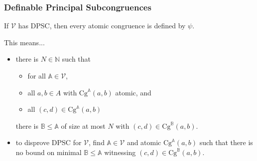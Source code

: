 \documentclass[compress,handout]{beamer}
\newcommand{\NN}{\mathbb{N}}
\newcommand{\V}{\mathcal{V}}
\newcommand{\A}{\mathbb{A}}
\theoremstyle{plain} \newtheorem{thm}{Theorem}
\theoremstyle{definition} \newtheorem{defn}[thm]{Definition}
\theoremstyle{remark} \newtheorem*{rk}{Remark}
\theoremstyle{plain} \newtheorem*{question}{Question}
\newcommand{\m}[1]{\mathbb{#1}}   %
\newcommand{\Cg}{\text{Cg}}
\begin{document}
\begin{frame} \frametitle{Definable Principal Subcongruences}
If $\V$ has DPSC, then every atomic congruence is defined by $\psi$.

\pause \vspace{6ex}

This means...
\begin{itemize} \setlength{\itemsep}{4ex}
  \item there is $N\in \NN$ such that 
  \begin{itemize}
    \pause \item for all $\A\in \V$,
    \pause \item all $a,b\in A$ with $\Cg^{\A}(a,b)$ atomic, and 
    \pause \item all $(c,d)\in \Cg^{\A}(a,b)$
  \end{itemize}
  \pause there is $\m{B}\leq \A$ of size at most $N$ with $(c,d)\in
  \Cg^{\m{B}}(a,b)$.

  \pause \item to disprove DPSC for $\V$, find $\A\in \V$ and atomic
  $\Cg^{\A}(a,b)$ such that there is no bound on minimal $\m{B}\leq \A$
  witnessing $(c,d)\in \Cg^{\m{B}}(a,b)$.
\end{itemize}
\end{frame}
\end{document}
